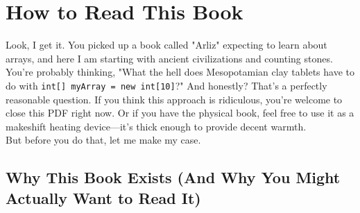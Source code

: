 \chapter*{How to Read This Book}

Look, I get it. You picked up a book called "Arliz" expecting to learn about arrays, and here I am starting with ancient civilizations and counting stones. You're probably thinking, "What the hell does Mesopotamian clay tablets have to do with \texttt{int[] myArray = new int[10]}?" And honestly? That's a perfectly reasonable question. If you think this approach is ridiculous, you're welcome to close this PDF right now. Or if you have the physical book, feel free to use it as a makeshift heating device—it's thick enough to provide decent warmth.\\
But before you do that, let me make my case.\

\section*{Why This Book Exists (And Why You Might Actually Want to Read It)}

